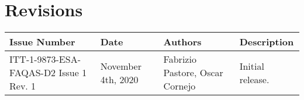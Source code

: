 
\section*{Revisions}
\label{sec:revisions}


\setlength\LTleft{0pt}
\setlength\LTright{0pt}
\tiny 
\begin{longtable}{|p{2cm}|p{1cm}|p{1.5cm}|p{9cm}|@{}}
\label{table:codeoperators} \\
\hline
\textbf{Issue Number}&\textbf{Date}&\textbf{Authors}&\textbf{Description}\\
\hline
ITT-1-9873-ESA-FAQAS-D2
Issue 1 Rev. 1&
November 4th, 2020&
Fabrizio Pastore, Oscar Cornejo&
\begin{minipage}{8cm}
Initial release.
\end{minipage}
\\
\hline



                                                    
\end{longtable}
\normalsize

\clearpage